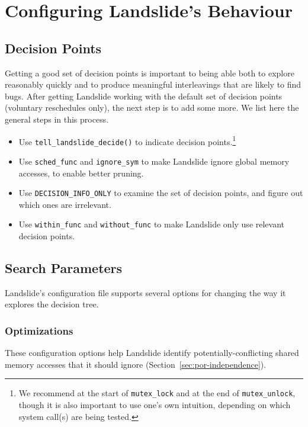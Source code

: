 \section{Configuring Landslide's Behaviour}
\label{sec:using-customise}
\subsection{Decision Points}
\label{sec:using-decision}

Getting a good set of decision points is important to being able both to explore reasonably quickly and to produce meaningful interleavings that are likely to find bugs. After getting Landslide working with the default set of decision points (voluntary reschedules only), the next step is to add some more. We list here the general steps in this process.

\begin{itemize}
        \item Use \texttt{tell\_landslide\_decide()} to indicate decision points.\footnote{
	We recommend at the start of \texttt{mutex\_lock} and at the end of \texttt{mutex\_unlock}, though it is also important to use one's own intuition, depending on which system call(s) are being tested.}
        \item Use \texttt{sched\_func} and \texttt{ignore\_sym} to make Landslide ignore global memory accesses, to enable better pruning.
        \item Use \texttt{DECISION\_INFO\_ONLY} to examine the set of decision points, and figure out which ones are irrelevant.
        \item Use \texttt{within\_func} and \texttt{without\_func} to make Landslide only use relevant decision points.
\end{itemize}

\subsection{Search Parameters}
\label{sec:using-search}

Landslide's configuration file supports several options for changing the way it explores the decision tree.

\subsubsection{Optimizations}

These configuration options help Landslide identify potentially-conflicting shared memory accesses that it should ignore (Section~\ref{sec:por-independence}).

